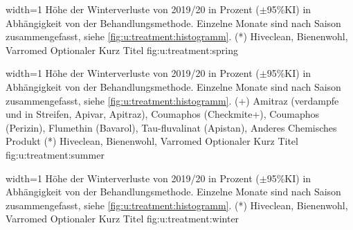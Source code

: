 {width=1\textwidth} %
{Höhe der Winterverluste von 2019/20 in Prozent ($\pm$95\%KI) in Abhängigkeit von der Behandlungsmethode. Einzelne Monate sind nach Saison zusammengefasst, siehe \cref{fig:u:treatment:histogramm}.
\newline
(*) Hiveclean, Bienenwohl, Varromed
} %
{Optionaler Kurz Titel} %
{fig:u:treatment:spring} %

{width=1\textwidth} %
{Höhe der Winterverluste von 2019/20 in Prozent ($\pm$95\%KI) in Abhängigkeit von der Behandlungsmethode. Einzelne Monate sind nach Saison zusammengefasst, siehe \cref{fig:u:treatment:histogramm}.
\newline 
(+) Amitraz (verdampfe und in Streifen, Apivar, Apitraz), Coumaphos (Checkmite+), Coumaphos (Perizin), Flumethin (Bavarol), Tau-fluvalinat (Apistan), Anderes Chemisches Produkt  
\newline
(*) Hiveclean, Bienenwohl, Varromed}
{Optionaler Kurz Titel} %
{fig:u:treatment:summer} %

{width=1\textwidth} %
{Höhe der Winterverluste von 2019/20 in Prozent ($\pm$95\%KI) in Abhängigkeit von der Behandlungsmethode. Einzelne Monate sind nach Saison zusammengefasst, siehe \cref{fig:u:treatment:histogramm}.
\newline 
(*) Hiveclean, Bienenwohl, Varromed}
{Optionaler Kurz Titel} %
{fig:u:treatment:winter} %

\label{sss:drohnenbrutentahme:u}

